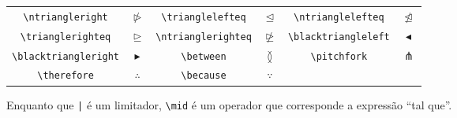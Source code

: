 \begin{tabular}{cc|cc|cc}
    \lstinline!\ntriangleright! & $\ntriangleright$ & \lstinline!\trianglelefteq! & $\trianglelefteq$ & \lstinline!\ntrianglelefteq! & $\ntrianglelefteq$ \\
    \lstinline!\trianglerighteq! & $\trianglerighteq$ & \lstinline!\ntrianglerighteq! & $\ntrianglerighteq$ &  \lstinline!\blacktriangleleft! & $\blacktriangleleft$ \\
    \lstinline!\blacktriangleright! & $\blacktriangleright$ & \lstinline!\between! & $\between$ & \lstinline!\pitchfork! & $\pitchfork$ \\
    \lstinline!\therefore! & $\therefore$ & \lstinline!\because! & $\because$ \\ \hline
\end{tabular}
\begin{flushleft}
    Enquanto que \lstinline!|! \'{e} um limitador, \lstinline!\mid! \'{e} um operador que corresponde a express\~{a}o ``tal que''.
\end{flushleft}
